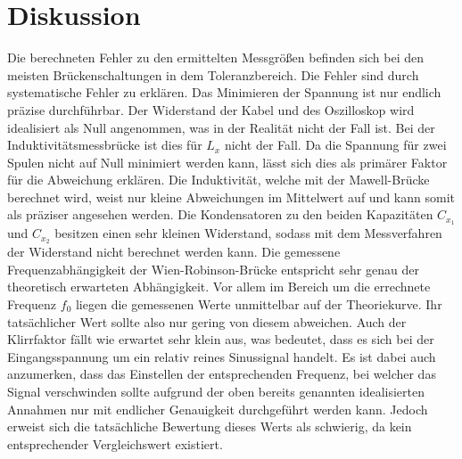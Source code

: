 \section{Diskussion}
\label{sec:Diskussion}
Die berechneten Fehler zu den ermittelten Messgrößen befinden sich bei den meisten
Brückenschaltungen in dem Toleranzbereich. Die Fehler sind durch systematische Fehler zu erklären.
Das Minimieren der Spannung ist nur endlich präzise durchführbar. Der Widerstand der Kabel und des Oszilloskop wird
idealisiert als Null angenommen, was in der Realität nicht der Fall ist.
Bei der Induktivitätsmessbrücke ist dies
für $L_x$ nicht der Fall. Da die Spannung für zwei Spulen nicht auf Null minimiert werden kann, lässt sich dies
als primärer Faktor für die Abweichung erklären. Die Induktivität, welche mit der Mawell-Brücke berechnet wird, weist
nur kleine Abweichungen im Mittelwert auf und kann somit als präziser angesehen werden. Die Kondensatoren
zu den beiden Kapazitäten $C_{x_1}$ und $C_{x_2}$ besitzen einen sehr kleinen Widerstand, sodass mit dem
Messverfahren der Widerstand nicht berechnet werden kann.
Die gemessene Frequenzabhängigkeit der Wien-Robinson-Brücke entspricht sehr genau der theoretisch erwarteten Abhängigkeit. Vor allem
im Bereich um die errechnete Frequenz $f_0$ liegen die gemessenen Werte unmittelbar auf der Theoriekurve. Ihr tatsächlicher Wert sollte
also nur gering von diesem abweichen.
Auch der Klirrfaktor fällt wie erwartet sehr klein aus, was bedeutet, dass es sich bei der Eingangsspannung um ein relativ reines
Sinussignal handelt. Es ist dabei auch anzumerken, dass das Einstellen der entsprechenden Frequenz, bei welcher das Signal
verschwinden sollte aufgrund der oben bereits genannten idealisierten Annahmen nur mit endlicher Genauigkeit durchgeführt werden kann.
Jedoch erweist sich die tatsächliche Bewertung dieses Werts als schwierig, da kein entsprechender Vergleichswert existiert.
